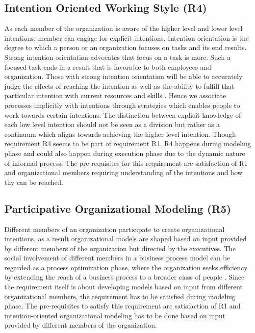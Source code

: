 \subsection{Intention Oriented Working Style (R4)}
As each member of the organization is aware of the higher level and lower level intentions, member can engage for explicit intentions. Intention orientation is the degree to which a person or an organization focuses on tasks and its end results. Strong intention orientation advocates that focus on a task is more. Such a focused task ends in a result that is favorable to both employees and organization. Those with strong intention orientation will be able to accurately judge the effects of reaching the intention as well as the ability to fulfill that particular intention with current resources and skills \cite{Lacom}. Hence we associate processes implicitly with intentions through strategies which enables people to work towards certain intentions. The distinction between explicit knowledge of each low level intention should not be seen as a division but rather as a continuum which aligns towards achieving the higher level intention. Though requirement R4 seems to be part of requirement R1, R4 happens during modeling phase and could also happen during execution phase due to the dynamic nature of informal process. The pre-requisites for this requirement are satisfaction of R1 and organizational members requiring understanding of the intentions and how thy can be reached.  

\subsection{Participative Organizational Modeling (R5)}
 Different members of an organization participate to create organizational intentions, as a result organizational models are shaped based on input provided by different members of the organization but directed by the executives. The social involvement of different members in a business process model can be regarded as a process optimization phase, where the organization seeks efficiency by extending the reach of a business process to a broader class of people \cite{Brambilla2012}. Since the requirement itself is about developing models based on input from different organizational members, the requirement has to be satisfied during modeling phase. The pre-requisites to satisfy this requirement are satisfaction of R1 and intention-oriented organizational modeling has to be done based on input provided by different members of the organization.  
 
